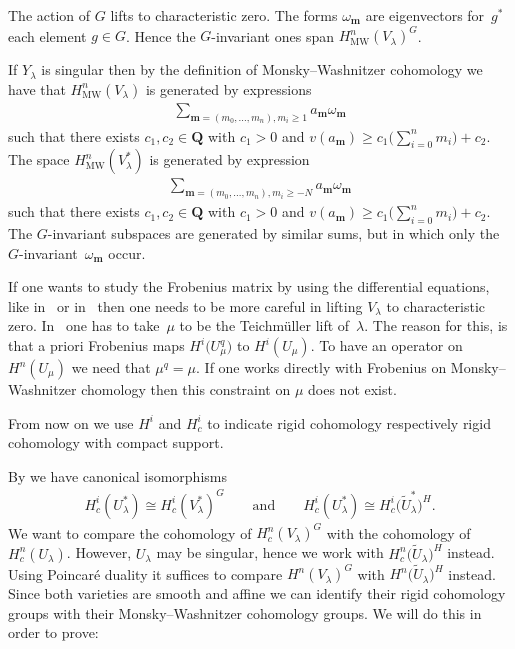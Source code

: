 \documentclass[pdftex]{sigma}
\numberwithin{equation}{section}
\DeclareMathOperator{\MW}{MW}
\begin{document}
\begin{Remark} The action of $G$ lifts to characteristic zero. The forms $\omega_{\mathbf{m}}$ are eigenvectors for~$g^*$ each element $g\in G$. Hence the $G$-invariant ones span $H^n_{\MW}(V_\lambda)^G$.

If $Y_{\lambda}$ is singular then by the def\/inition of Monsky--Washnitzer cohomology we have that $H^n_{\MW}(V_\lambda)$ is generated by expressions
\begin{gather*} \sum_{\mathbf{m}=(m_0,\dots,m_n),m_i\geq 1} a_{\mathbf{m}} \omega_{\mathbf{m}}\end{gather*}
such that there exists $c_1,c_2 \in \mathbf{Q}$ with $c_1>0$ and $v(a_{\mathbf{m}})\geq c_1\big(\sum\limits_{i=0}^n m_i\big)+c_2$. The space $H^n_{\MW}(V_\lambda^*)$ is generated by expression
\begin{gather*} \sum_{\mathbf{m}=(m_0,\dots,m_n),m_i\geq -N} a_{\mathbf{m}} \omega_{\mathbf{m}}\end{gather*}
such that there exists $c_1,c_2 \in \mathbf{Q}$ with $c_1>0$ and $v(a_{\mathbf{m}})\geq c_1\big(\sum\limits_{i=0}^n m_i\big)+c_2$. The $G$-invariant subspaces are generated by similar sums, but in which only the $G$-invariant~$\omega_{\mathbf{m}}$ occur.
\end{Remark}

\begin{Remark} If one wants to study the Frobenius matrix by using the dif\/ferential equations, like in~\cite{Katz} or in~\cite{DKSSVW} then one needs to be more careful in lifting $V_\lambda$ to characteristic zero. In~\cite{Katz} one has to take~$\mu$ to be the Teichm\"uller lift of~$\lambda$. The reason for this, is that a priori Frobenius maps $H^i\big(U_\mu^q\big)$ to $H^i(U_\mu)$. To have an operator on $H^n(U_\mu)$ we need that $\mu^q=\mu$. If one works directly with Frobenius on Monsky--Washnitzer chomology then this constraint on $\mu$ does not exist.
\end{Remark}

From now on we use $H^i$ and $H^i_c$ to indicate rigid cohomology respectively rigid cohomology with compact support.

By \cite[Proposition 2.1]{Zetafamrec} we have canonical isomorphisms
\begin{gather*} H^i_c(U_\lambda^*)\cong H^i_c(V_\lambda^*)^G \qquad \text{and} \qquad H^i_c(U_\lambda^*)\cong H^i_c\big(\tilde{U}_\lambda^*\big)^H.\end{gather*}
We want to compare the cohomology of $H^n_c(V_\lambda)^G$ with the cohomology of~$H^n_c(U_{\lambda})$. However, $U_\lambda$ may be singular, hence we work with $H^n_c\big(\tilde{U}_\lambda\big)^ H$ instead. Using Poin\-car\'e duality it suf\/f\/ices to compare $H^n(V_\lambda)^ G$ with $H^n\big(\tilde{U}_\lambda\big)^H$ instead. Since both varieties are smooth and af\/f\/ine we can identify their rigid cohomology groups with their Monsky--Washnitzer cohomology groups. We will do this in order to prove:
\end{document}
